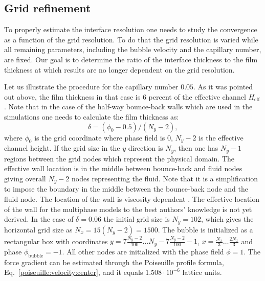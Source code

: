 \documentclass[preprint,12pt]{elsarticle}
\begin{document}
\subsection{Grid refinement}
\label{section:grid:refinement}
To properly estimate the interface resolution one needs to study the convergence as a function of
the grid resolution. To do that the grid resolution is varied while all remaining parameters,
including the bubble velocity and the capillary number, are fixed.  Our goal is to determine the 
ratio of the interface thickness to the 
film thickness at which results are no longer dependent on the grid resolution.

Let us illustrate the procedure for the capillary number
$0.05$. As it was pointed out above, the film thickness in that case is $6$ percent of the
effective
channel $H_{\mathrm{eff}}$.
Note that in the case of the half-way bounce-back walls \cite{yu} which are used in the
simulations one needs to calculate the film thickness as:
\begin{equation}
\delta=(\phi_0-0.5)/(N_y-2),
\end{equation}
where $\phi_0$ is the grid coordinate where phase field is $0$, $N_y-2$
is the effective channel height.
If the grid size in the $y$ direction is $N_y$, then one has $N_y-1$ regions between the grid nodes
which represent
the physical domain. The effective wall location is in the middle between bounce-back and fluid nodes giving
overall $N_y-2$ nodes representing the fluid. Note that it is a simplification to impose the
boundary in the middle between the bounce-back
node and the fluid node. The location of the wall is
viscosity dependent \cite{ginzburg-multireflection}.  The effective location of the
wall for the
multiphase models to the best authors' knowledge is not yet derived. In the case of $\delta=0.06$
the
initial grid size is $N_y=102$, which gives the horizontal grid size as $N_x=15(N_y-2)=1500$.
The bubble is initialized as a rectangular box with coordinates
{\color{red}$y=7\frac{N_y-2}{100}\dots N_y-7\frac{N_y-2}{100}-1$}, $x=\frac{N_x}{3}\dots \frac{2
N_x}{3}$ and phase
$\phi_{\mathrm{bubble}}=-1$. All other nodes are initialized with the phase field
$\phi=1$. The force gradient can be estimated through the Poiseuille
profile formula, Eq.~\ref{poiseuille:velocity:center}, and it equals
$1.508 \cdot 10^{-6}$ lattice units.
\end{document}
